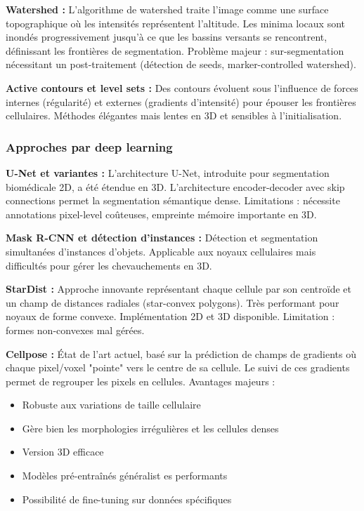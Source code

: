\textbf{Watershed :}
L'algorithme de watershed traite l'image comme une surface topographique où les intensités représentent l'altitude. Les minima locaux sont inondés progressivement jusqu'à ce que les bassins versants se rencontrent, définissant les frontières de segmentation. Problème majeur : sur-segmentation nécessitant un post-traitement (détection de seeds, marker-controlled watershed).

\textbf{Active contours et level sets :}
Des contours évoluent sous l'influence de forces internes (régularité) et externes (gradients d'intensité) pour épouser les frontières cellulaires. Méthodes élégantes mais lentes en 3D et sensibles à l'initialisation.

\subsubsection{Approches par deep learning}

\textbf{U-Net et variantes :}
L'architecture U-Net, introduite pour segmentation biomédicale 2D, a été étendue en 3D. L'architecture encoder-decoder avec skip connections permet la segmentation sémantique dense. Limitations : nécessite annotations pixel-level coûteuses, empreinte mémoire importante en 3D.

\textbf{Mask R-CNN et détection d'instances :}
Détection et segmentation simultanées d'instances d'objets. Applicable aux noyaux cellulaires mais difficultés pour gérer les chevauchements en 3D.

\textbf{StarDist :}
Approche innovante représentant chaque cellule par son centroïde et un champ de distances radiales (star-convex polygons). Très performant pour noyaux de forme convexe. Implémentation 2D et 3D disponible. Limitation : formes non-convexes mal gérées.

\textbf{Cellpose :}
État de l'art actuel, basé sur la prédiction de champs de gradients où chaque pixel/voxel "pointe" vers le centre de sa cellule. Le suivi de ces gradients permet de regrouper les pixels en cellules. Avantages majeurs :
\begin{itemize}
    \item Robuste aux variations de taille cellulaire
    \item Gère bien les morphologies irrégulières et les cellules denses
    \item Version 3D efficace
    \item Modèles pré-entraînés généralist es performants
    \item Possibilité de fine-tuning sur données spécifiques
\end{itemize}

